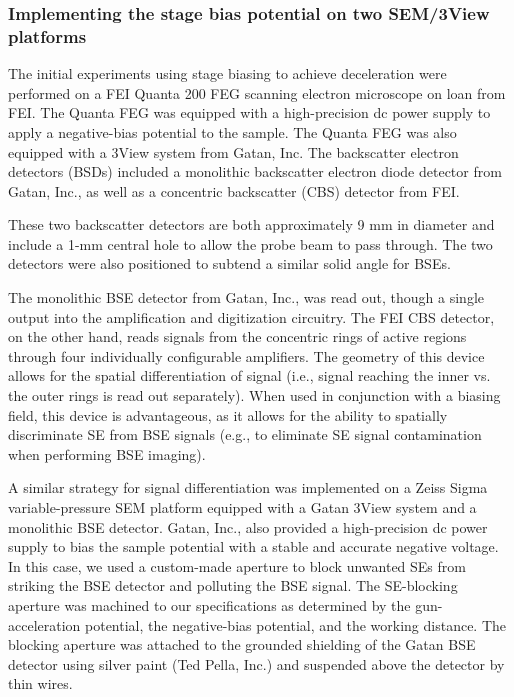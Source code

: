 \documentclass{article}
\begin{document}
\subsubsection*{Implementing the stage bias potential on two SEM/3View platforms}
The initial experiments using stage biasing to achieve deceleration were performed on a FEI Quanta 200 FEG scanning electron microscope on loan from FEI. The Quanta FEG was equipped with a high-precision dc power supply to apply a negative-bias potential to the sample. The Quanta FEG was also equipped with a 3View system from Gatan, Inc. The backscatter electron detectors (BSDs) included a monolithic backscatter electron diode detector from Gatan, Inc., as well as a concentric backscatter (CBS) detector from FEI.

These two backscatter detectors are both approximately 9 mm in diameter and include a 1-mm central hole to allow the probe beam to pass through. The two detectors were also positioned to subtend a similar solid angle for BSEs.

The monolithic BSE detector from Gatan, Inc., was read out, though a single output into the amplification and digitization circuitry. The FEI CBS detector, on the other hand, reads signals from the concentric rings of active regions through four individually configurable amplifiers. The geometry of this device allows for the spatial differentiation of signal (i.e., signal reaching the inner vs. the outer rings is read out separately). When used in conjunction with a biasing field, this device is advantageous, as it allows for the ability to spatially discriminate SE from BSE signals (e.g., to eliminate SE signal contamination when performing BSE imaging).

A similar strategy for signal differentiation was implemented on a Zeiss Sigma variable-pressure SEM platform equipped with a Gatan 3View system and a monolithic BSE detector. Gatan, Inc., also provided a high-precision dc power supply to bias the sample potential with a stable and accurate negative voltage. In this case, we used a custom-made aperture to block unwanted SEs from striking the BSE detector and polluting the BSE signal. The SE-blocking aperture was machined to our specifications as determined by the gun-acceleration potential, the negative-bias potential, and the working distance. The blocking aperture was attached to the grounded shielding of the Gatan BSE detector using silver paint (Ted Pella, Inc.) and suspended above the detector by thin wires.
\end{document}
